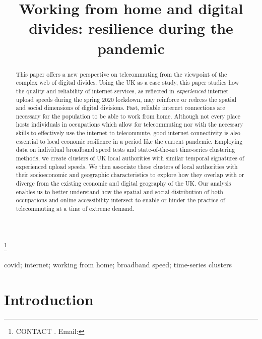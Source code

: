 \documentclass[]{interact}
\theoremstyle{plain}%
\theoremstyle{definition}
\theoremstyle{remark}
\begin{document}
\articletype{}

\title{Working from home and digital divides: resilience during the pandemic}


\author{
}

\thanks{CONTACT . Email: }

\maketitle

\begin{abstract}
This paper offers a new perspective on telecommuting from the viewpoint
of the complex web of digital divides. Using the UK as a case study,
this paper studies how the quality and reliability of internet services,
as reflected in \emph{experienced} internet upload speeds during the
spring 2020 lockdown, may reinforce or redress the spatial and social
dimensions of digital divisions. Fast, reliable internet connections are
necessary for the population to be able to work from home. Although not
every place hosts individuals in occupations which allow for
telecommuting nor with the necessary skills to effectively use the
internet to telecommute, good internet connectivity is also essential to
local economic resilience in a period like the current pandemic.
Employing data on individual broadband speed tests and state-of-the-art
time-series clustering methods, we create clusters of UK local
authorities with similar temporal signatures of experienced upload
speeds. We then associate these clusters of local authorities with their
socioeconomic and geographic characteristics to explore how they overlap
with or diverge from the existing economic and digital geography of the
UK. Our analysis enables us to better understand how the spatial and
social distribution of both occupations and online accessibility
intersect to enable or hinder the practice of telecommuting at a time of
extreme demand.
\end{abstract}

\begin{keywords}
covid; internet; working from home; broadband speed; time-series
clusters
\end{keywords}

\hypertarget{sec:1}{%
\section{Introduction}\label{sec:1}}
\end{document}
